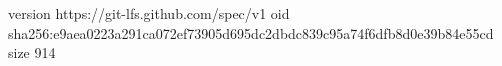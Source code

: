 version https://git-lfs.github.com/spec/v1
oid sha256:e9aea0223a291ca072ef73905d695dc2dbdc839c95a74f6dfb8d0e39b84e55cd
size 914

